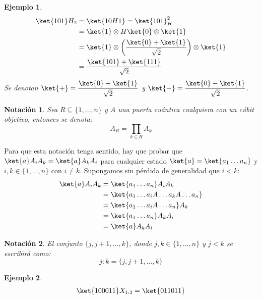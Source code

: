 \documentclass[10pt,conference,a4paper]{IEEEtran}
\newtheorem{notacion}{Notación}[subsection]
\newtheorem{ejemplo}{Ejemplo}
\begin{document}
\begin{ejemplo}
\begin{align*}
    \ket{101}H_2&=\ket{10H1}=\ket{101}_H^2\\
    &=\ket{1}\otimes H\ket{0}\otimes\ket{1}\\
    &=\ket{1}\otimes\left(\dfrac{\ket{0}+\ket{1}}{\sqrt{2}}\right)\otimes\ket{1}\\
    &=\dfrac{\ket{101}+\ket{111}}{\sqrt{2}}
\end{align*}
Se denotan $\ket{+}=\dfrac{\ket{0}+\ket{1}}{\sqrt{2}}$ y $\ket{-}=\dfrac{\ket{0}-\ket{1}}{\sqrt{2}}$.
\end{ejemplo}
\vspace{3mm}
\begin{notacion}
    Sea $R\subseteq \{1,\ldots,n\}$ y $A$ una puerta cuántica cualquiera con un cúbit objetivo, entonces se denota:
    \begin{equation}
        A_R=\displaystyle\prod_{k\in R}A_k
        \label{not:5}
    \end{equation}
\end{notacion}
Para que esta notación tenga sentido, hay que probar que $\ket{a}A_iA_k=\ket{a}A_kA_i$ para cualquier estado $\ket{a}=\ket{a_1\ldots a_n}$ y $i,k\in\{1,\ldots,n\}$ con $i\neq k$. Supongamos sin pérdida de generalidad que $i<k$:\\
\begin{align*}
    \ket{a}A_iA_k&=\ket{a_1\ldots a_n}A_iA_k\\
    &=\ket{a_1\ldots a_iA\ldots a_kA \ldots a_n}\\
    &=\ket{a_1\ldots a_iA \ldots a_n}A_k\\
    &=\ket{a_1\ldots a_n}A_k A_i\\
    &=\ket{a}A_kA_i
\end{align*}
\vspace{1.5mm}
\begin{notacion}
    El conjunto $\{j,j+1,\ldots,k\}$, donde $j,k\in\{1,\ldots,n\}$ y $j<k$ se escribirá como:
    \begin{equation}
        j:k= \{j,j+1,\ldots,k\}
        \label{not:6}
    \end{equation}
\end{notacion}

\begin{ejemplo}
    \begin{align*}
        \ket{100011}X_{1:3}=\ket{011011}
    \end{align*}
\end{ejemplo} 
\vspace{0.15cm}
\end{document}
